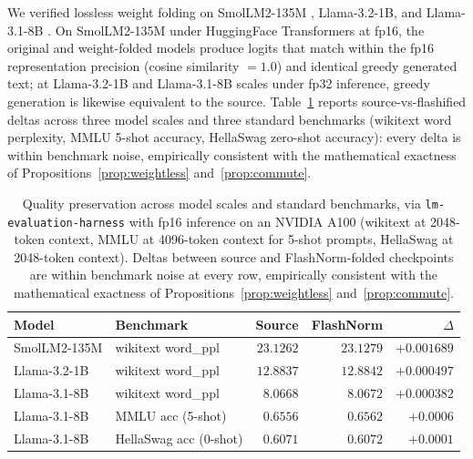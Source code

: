 \documentclass{article}
\begin{document}
We verified lossless weight folding on SmolLM2-135M \citep{smollm}, Llama-3.2-1B, and Llama-3.1-8B \citep{LLaMA}.
On SmolLM2-135M under HuggingFace Transformers at fp16, the original and weight-folded models produce logits that match within the fp16 representation precision (cosine similarity $= 1.0$) and identical greedy generated text; at Llama-3.2-1B and Llama-3.1-8B scales under fp32 inference, greedy generation is likewise equivalent to the source. Table~\ref{tab:quality} reports source-vs-flashified deltas across three model scales and three standard benchmarks (wikitext word perplexity, MMLU 5-shot accuracy, HellaSwag zero-shot accuracy): every delta is within benchmark noise, empirically consistent with the mathematical exactness of Propositions~\ref{prop:weightless} and~\ref{prop:commute}.

\begin{table}[h!] \centering
\caption{Quality preservation across model scales and standard benchmarks, via \texttt{lm-evaluation-harness} with fp16 inference on an NVIDIA A100 (wikitext at 2048-token context, MMLU at 4096-token context for 5-shot prompts, HellaSwag at 2048-token context). Deltas between source and FlashNorm-folded checkpoints are within benchmark noise at every row, empirically consistent with the mathematical exactness of Propositions~\ref{prop:weightless} and~\ref{prop:commute}.}
\label{tab:quality}
\begin{tabular}{l l r r r}
\hline
Model & Benchmark & Source & FlashNorm & $\Delta$ \\
\hline
SmolLM2-135M & wikitext word\_ppl          & $23.1262$ & $23.1279$ & $+0.001689$ \\
Llama-3.2-1B & wikitext word\_ppl          & $12.8837$ & $12.8842$ & $+0.000497$ \\
Llama-3.1-8B & wikitext word\_ppl          & $8.0668$  & $8.0672$  & $+0.000382$ \\
Llama-3.1-8B & MMLU acc (5-shot)           & $0.6556$  & $0.6562$  & $+0.0006$ \\
Llama-3.1-8B & HellaSwag acc (0-shot)      & $0.6071$  & $0.6072$  & $+0.0001$ \\
\hline
\end{tabular}
\end{table}
\end{document}
